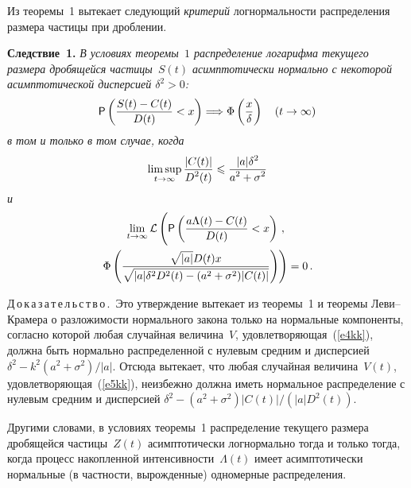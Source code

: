 \begin{multicols}{2}
\smallskip

Из теоремы~1 вытекает следующий {\it критерий} логнормальности
распределения размера частицы при дроблении.

\smallskip

\noindent
\textbf{Следствие~1.} {\it В условиях теоремы~$1$ распределение
логарифма текущего размера дробящейся частицы~$S(t)$
асимптотически нормально с некоторой асимптотической дисперсией
$\delta^2>0$:
$$
{\sf P}\left(\displaystyle\frac{\displaystyle S(t)-C(t)\mathstrut}{\displaystyle D(t)\mathstrut}<x\right)\Longrightarrow
\Phi\left(\displaystyle\frac{\displaystyle x\mathstrut}{\displaystyle \delta\mathstrut}\right)\quad (t\to\infty)
$$
в том и только в том случае, когда
$$
\limsup_{t\to\infty}\displaystyle\frac{\displaystyle |C(t)|\mathstrut}{\displaystyle D^2(t)\mathstrut}\leqslant\displaystyle\frac{\displaystyle |a|\delta^2\mathstrut}{\displaystyle a^2+\sigma^2\mathstrut}
$$
и
\begin{multline*}
\lim_{t\to\infty}\mathcal{L}\left(
\vphantom{\fr{\sqrt{|a|}D(t)x}{\sqrt{|a|\delta^2D^2(t)-(a^2+\sigma^2)
|C(t)|}}}
{\sf
P}\left(\fr{a\Lambda(t)-C(t)}{D(t)}<x\right)\,,\right.\\
\left.\Phi\left(\fr{\sqrt{|a|}D(t)x}{\sqrt{|a|\delta^2D^2(t)-(a^2+\sigma^2)
|C(t)|}}\right )\right)=0\,.
\end{multline*}
}

\noindent
Д\,о\,к\,а\,з\,а\,т\,е\,л\,ь\,с\,т\,в\,о\,.\ Это утверждение вытекает из теоремы~1 и теоремы
Леви--Крамера о разложимости нормального закона только на
нормальные компоненты, согласно которой любая случайная величина~$V$,
удовлетворяющая~(\ref{e4kk}), должна быть нормально распределенной с
нулевым средним и дисперсией $\delta^2-k^2(a^2+\sigma^2)/|a|$.
Отсюда вытекает, что любая случайная величина~$V(t)$,
удовлетворяющая~(\ref{e5kk}), неизбежно должна иметь нормальное
распределение с нулевым средним и дисперсией
$\delta^2-\left(a^2+\sigma^2\right)|C(t)|/\left( |a|D^2(t)\right)$.

\medskip

Другими словами, в условиях теоремы~1 распределение текущего
размера дробящейся частицы~$Z(t)$ асимптотически логнормально
тогда и\linebreak
только тогда, когда процесс накопленной интенсивности~$\Lambda(t)$
имеет асимптотически нормальные (в частности,
вырожденные) одномерные распределения.


\end{multicols}
